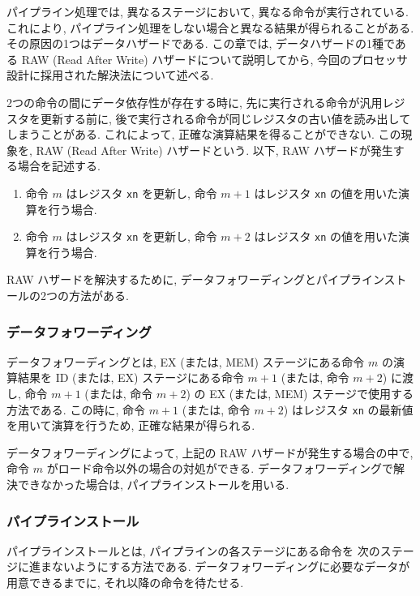 \documentclass[../specifications.tex]{subfiles}
\begin{document}
  パイプライン処理では, 異なるステージにおいて, 異なる命令が実行されている.
  これにより, パイプライン処理をしない場合と異なる結果が得られることがある.
  その原因の1つはデータハザードである.
  この章では, データハザードの1種である RAW (Read After Write) ハザードについて説明してから, 
  今回のプロセッサ設計に採用された解決法について述べる.

  2つの命令の間にデータ依存性が存在する時に, 
  先に実行される命令が汎用レジスタを更新する前に, 
  後で実行される命令が同じレジスタの古い値を読み出してしまうことがある.
  これによって, 正確な演算結果を得ることができない.
  この現象を, RAW (Read After Write) ハザードという.
  以下, RAW ハザードが発生する場合を記述する.

  \begin{enumerate}
    \item 命令 $m$ はレジスタ \verb|xn| を更新し, 
    命令 $m+1$ はレジスタ \verb|xn| の値を用いた演算を行う場合.

    \item 命令 $m$ はレジスタ \verb|xn| を更新し, 
    命令 $m+2$ はレジスタ \verb|xn| の値を用いた演算を行う場合.
  \end{enumerate}

  RAW ハザードを解決するために, データフォワーディングとパイプラインストールの2つの方法がある.

  \subsubsection{データフォワーディング}
  データフォワーディングとは, EX (または, MEM) ステージにある命令 $m$ の演算結果を
  ID (または, EX) ステージにある命令 $m+1$ (または, 命令 $m+2$) に渡し, 
  命令 $m+1$ (または, 命令 $m+2$) の EX (または, MEM) ステージで使用する方法である.
  この時に, 命令 $m+1$ (または, 命令 $m+2$) はレジスタ \verb|xn| の最新値
  を用いて演算を行うため, 正確な結果が得られる.

  データフォワーディングによって, 上記の RAW ハザードが発生する場合の中で, 
  命令 $m$ がロード命令以外の場合の対処ができる.
  データフォワーディングで解決できなかった場合は, 
  パイプラインストールを用いる.

  \subsubsection{パイプラインストール}
  パイプラインストールとは, パイプラインの各ステージにある命令を
  次のステージに進まないようにする方法である.
  データフォワーディングに必要なデータが用意できるまでに, 
  それ以降の命令を待たせる.
  
\end{document}
